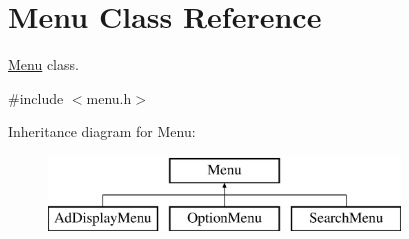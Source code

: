 \hypertarget{class_menu}{}\section{Menu Class Reference}
\label{class_menu}


\hyperlink{class_menu}{Menu} class.  




{\ttfamily \#include $<$menu.\+h$>$}

Inheritance diagram for Menu\+:\begin{figure}[H]
\begin{center}
\leavevmode
\includegraphics[height=2.000000cm]{class_menu}
\end{center}
\end{figure}
